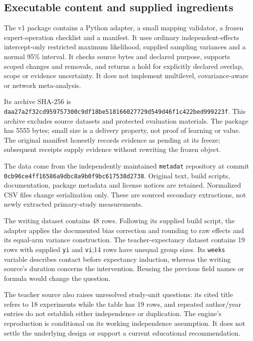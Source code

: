 \documentclass[11pt]{article}
\begin{document}
\subsection{Executable content and supplied ingredients}

The v1 package contains a Python adapter, a small mapping validator, a frozen expert-operation checklist and a manifest. It uses ordinary independent-effects intercept-only restricted maximum likelihood, supplied sampling variances and a normal 95\% interval. It checks source bytes and declared purpose, supports scoped changes and removals, and returns a hold for explicitly declared overlap, scope or evidence uncertainty. It does not implement multilevel, covariance-aware or network meta-analysis.

Its archive SHA-256 is {\footnotesize\nolinkurl{daa27a2f32cd959757300c9df18be518166027729d549d46f1c422bed999223f}}. This archive excludes source datasets and protected evaluation materials. The package has 5555 bytes; small size is a delivery property, not proof of learning or value. The original manifest honestly records evidence as pending at its freeze; subsequent receipts supply evidence without rewriting the frozen object.

The data come from the independently maintained \texttt{metadat} repository at commit \nolinkurl{0cb96ce4ff16586a9dbc8a9b0f9bc617538d2738}. Original text, build scripts, documentation, package metadata and license notices are retained. Normalized CSV files change serialization only. These are sourced secondary extractions, not newly extracted primary-study measurements.\citep{metadat,bangert,raud}

The writing dataset contains 48 rows. Following its supplied build script, the adapter applies the documented bias correction and rounding to raw effects and its equal-arm variance construction. The teacher-expectancy dataset contains 19 rows with supplied \texttt{yi} and \texttt{vi};14 rows have unequal group sizes. Its \texttt{weeks} variable describes contact before expectancy induction, whereas the writing source's duration concerns the intervention. Reusing the previous field names or formula would change the question.

The teacher source also raises unresolved study-unit questions: its cited title refers to 18 experiments while the table has 19 rows, and repeated author/year entries do not establish either independence or duplication. The engine's reproduction is conditional on its working independence assumption. It does not settle the underlying design or support a current educational recommendation.
\end{document}
